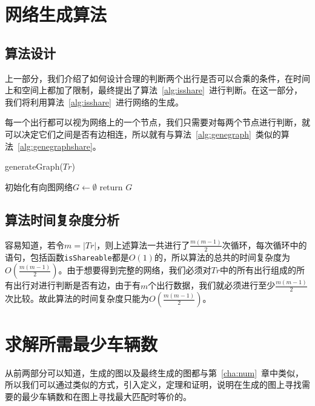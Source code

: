\section{网络生成算法}
\subsection{算法设计}
上一部分，我们介绍了如何设计合理的判断两个出行是否可以合乘的条件，在时间上和空间上都加了限制，最终提出了算法~\ref{alg:isshare}~进行判断。在这一部分，我们将利用算法~\ref{alg:isshare}~进行网络的生成。
\par
每一个出行都可以视为网络上的一个节点，我们只需要对每两个节点进行判断，就可以决定它们之间是否有边相连，所以就有与算法~\ref{alg:genegraph}~类似的算法~\ref{alg:genegraphshare}。
\begin{algorithm}[htbp]
\SetAlgoLined
{}
\caption{generateGraph($Tr$)}
\label{alg:genegraphshare}
\BlankLine
初始化有向图网络$G \leftarrow \emptyset$\;
return $G$\;
\end{algorithm}

\subsection{算法时间复杂度分析}
容易知道，若令$m = |Tr|$，则上述算法一共进行了$\frac{m(m-1)}{2}$次循环，每次循环中的语句，包括函数\texttt{isShareable}都是$O(1)$的，所以算法的总共的时间复杂度为$O(\frac{m(m-1)}{2})$。由于想要得到完整的网络，我们必须对$Tr$中的所有出行组成的所有出行对进行判断是否有边，由于有$m$个出行数据，我们就必须进行至少$\frac{m(m-1)}{2}$次比较。故此算法的时间复杂度只能为$O(\frac{m(m-1)}{2})$。

\section{求解所需最少车辆数}
从前两部分可以知道，生成的图以及最终生成的图都与第~\ref{cha:num}~章中类似，所以我们可以通过类似的方式，引入定义，定理和证明，说明在生成的图上寻找需要的最少车辆数和在图上寻找最大匹配时等价的。
